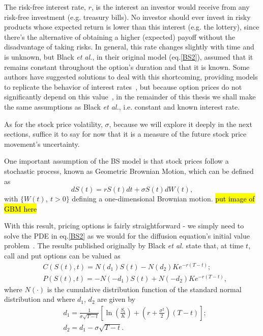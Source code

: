 The risk-free interest rate, $r$, is the interest an investor would receive from any risk-free investment (e.g. treasury bills). No investor should ever invest in risky products whose expected return is lower than this interest (e.g. the lottery), since there's the alternative of obtaining a higher (expected) payoff without the disadvantage of taking risks. In general, this rate changes slightly with time and is unknown, but Black \textit{et al.}, in their original model (eq.\eqref{BS2}), assumed that it remains constant throughout the option's duration and that it is known. Some authors have suggested solutions to deal with this shortcoming, providing models to replicate the behavior of interest rates~\cite{HJM}, but because option prices do not significantly depend on this value~\cite{Wilmott3}, in the remainder of this thesis we shall make the same assumptions as Black \textit{et al.}, i.e. constant and known interest rate.

As for the stock price volatility, $\sigma$, because we will explore it deeply in the next sections, suffice it to say for now that it is a measure of the future stock price movement's uncertainty.

One important assumption of the BS model is that stock prices follow a stochastic process, known as Geometric Brownian Motion, which can be defined as
\begin{equation}\label{GBM}
dS(t)=rS(t)dt+\sigma S(t)dW(t),
\end{equation}
\noindent with $\{W(t),\ t>0\}$ defining a one-dimensional Brownian motion.
\hl{put image of GBM here}

With this result, pricing options is fairly straightforward - we simply need to solve the PDE in eq.\eqref{BS2} as we would for the diffusion equation's initial value problem~\cite{Dilao}.
The results published originally by Black \textit{et al.} state that, at time $t$, call and put options can be valued as
\begin{equation}\label{callputBS}
\begin{split}
&C(S(t),t)=N(d_1)S(t)-N(d_2)Ke^{-r(T-t)};\\
&P(S(t),t)=-N(-d_1)S(t)+N(-d_2)Ke^{-r(T-t)},
\end{split}
\end{equation}
\noindent where $N(\cdot)$ is the cumulative distribution function of the standard normal distribution and where $d_1$, $d_2$ are given by
\begin{equation}\label{d1d2}
\begin{split}
&d_1=\frac{1}{\sigma\sqrt{T-t}}\left[\ln\left(\frac{S_t}{K}\right)+\left(r+\frac{\sigma^2}{2}\right)(T - t)\right];\\
&d_2=d_1-\sigma\sqrt{T-t}.\\
\end{split}
\end{equation}



